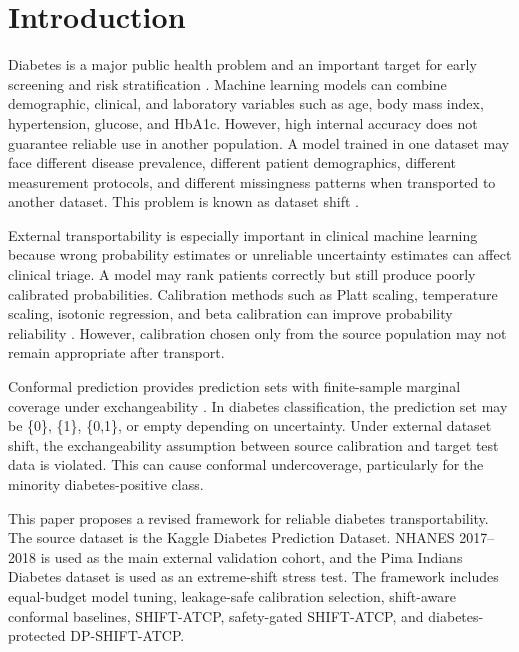 \documentclass{ieeeaccess}
\begin{document}
\titlepgskip=-15pt
\maketitle

\section{Introduction}
Diabetes is a major public health problem and an important target for early screening and risk stratification \cite{who2023diabetes}. Machine learning models can combine demographic, clinical, and laboratory variables such as age, body mass index, hypertension, glucose, and HbA1c. However, high internal accuracy does not guarantee reliable use in another population. A model trained in one dataset may face different disease prevalence, different patient demographics, different measurement protocols, and different missingness patterns when transported to another dataset. This problem is known as dataset shift \cite{datasetShift}.

External transportability is especially important in clinical machine learning because wrong probability estimates or unreliable uncertainty estimates can affect clinical triage. A model may rank patients correctly but still produce poorly calibrated probabilities. Calibration methods such as Platt scaling, temperature scaling, isotonic regression, and beta calibration can improve probability reliability \cite{plattScaling,zadrozny2002,guo2017,kull2017}. However, calibration chosen only from the source population may not remain appropriate after transport.

Conformal prediction provides prediction sets with finite-sample marginal coverage under exchangeability \cite{vovk2005,shafer2008,angelopoulos2023}. In diabetes classification, the prediction set may be \{0\}, \{1\}, \{0,1\}, or empty depending on uncertainty. Under external dataset shift, the exchangeability assumption between source calibration and target test data is violated. This can cause conformal undercoverage, particularly for the minority diabetes-positive class.

This paper proposes a revised framework for reliable diabetes transportability. The source dataset is the Kaggle Diabetes Prediction Dataset. NHANES 2017--2018 is used as the main external validation cohort, and the Pima Indians Diabetes dataset is used as an extreme-shift stress test. The framework includes equal-budget model tuning, leakage-safe calibration selection, shift-aware conformal baselines, SHIFT-ATCP, safety-gated SHIFT-ATCP, and diabetes-protected DP-SHIFT-ATCP.
\end{document}
